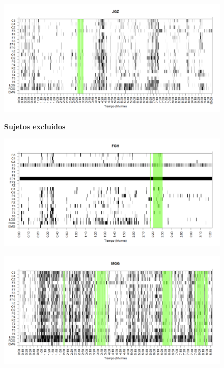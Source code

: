 \documentclass[12pt,a4paper]{mitthesis}
\begin{document}
\begin{figure}
\centering
\includegraphics[width=0.8\linewidth]
{./img_ejemplos/JGMN6SUE_est.png} 
\label{grf_JGZ}
\end{figure}


\begin{figure}
\Large{\textbf{Sujetos excluidos}}
\end{figure}

\begin{figure}
\centering
\includegraphics[width=0.8\linewidth]
{./img_ejemplos/FGHSUE_est.png} 
\label{grf_FGH}
\end{figure}

\begin{figure}
\centering
\includegraphics[width=0.8\linewidth]
{./img_ejemplos/MGNA5SUE_est.png} 
\label{grf_MGG}
\end{figure}
\end{document}
